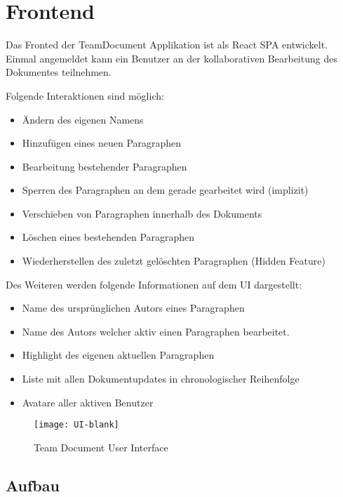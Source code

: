 \section{Frontend}

Das Fronted der TeamDocument Applikation ist als React SPA entwickelt.
Einmal angemeldet kann ein Benutzer an der kollaborativen Bearbeitung des Dokumentes teilnehmen.

Folgende Interaktionen sind möglich:

\begin{itemize}
    \item Ändern des eigenen Namens
    \item Hinzufügen eines neuen Paragraphen
    \item Bearbeitung bestehender Paragraphen
    \item Sperren des Paragraphen an dem gerade gearbeitet wird (implizit)
    \item Verschieben von Paragraphen innerhalb des Dokuments
    \item Löschen eines bestehenden Paragraphen
    \item Wiederherstellen des zuletzt gelöschten Paragraphen (Hidden Feature)
\end{itemize}

Des Weiteren werden folgende Informationen auf dem UI dargestellt:

\begin{itemize}
    \item Name des ursprünglichen Autors eines Paragraphen
    \item Name des Autors welcher aktiv einen Paragraphen bearbeitet.
    \item Highlight des eigenen aktuellen Paragraphen
    \item Liste mit allen Dokumentupdates in chronologischer Reihenfolge
    \item Avatare aller aktiven Benutzer
\end{itemize}

\begin{figure}[H]
    \texttt{[image: UI-blank]}
    \caption{Team Document User Interface}
    \label{fig:Team Document User Interface}
\end{figure}


\subsection{Aufbau}

